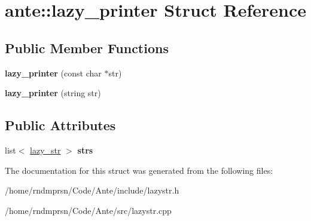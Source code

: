\hypertarget{structante_1_1lazy__printer}{}\section{ante\+:\+:lazy\+\_\+printer Struct Reference}
\label{structante_1_1lazy__printer}
\subsection*{Public Member Functions}
\begin{DoxyCompactItemize}
\item 
\mbox{\label{structante_1_1lazy__printer_a13fb2d04fda586fe8f527505f7bee714}} 
{\bfseries lazy\+\_\+printer} (const char $\ast$str)
\item 
\mbox{\label{structante_1_1lazy__printer_a0b47da53fba2e6e365970fc9da324bba}} 
{\bfseries lazy\+\_\+printer} (string str)
\end{DoxyCompactItemize}
\subsection*{Public Attributes}
\begin{DoxyCompactItemize}
\item 
\mbox{\label{structante_1_1lazy__printer_a5b99ecd910d515192518b74f0eba911b}} 
list$<$ \hyperlink{structante_1_1lazy__str}{lazy\+\_\+str} $>$ {\bfseries strs}
\end{DoxyCompactItemize}


The documentation for this struct was generated from the following files\+:\begin{DoxyCompactItemize}
\item 
/home/rndmprsn/\+Code/\+Ante/include/lazystr.\+h\item 
/home/rndmprsn/\+Code/\+Ante/src/lazystr.\+cpp\end{DoxyCompactItemize}
